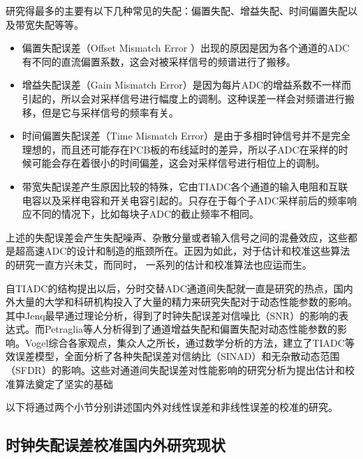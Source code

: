 	研究得最多的主要有以下几种常见的失配：偏置失配、增益失配、时间偏置失配以及带宽失配等等。
	\begin{itemize}
		\item 偏置失配误差（Offset Mismatch Error ）出现的原因是因为各个通道的ADC有不同的直流偏置系数，这会对被采样信号的频谱进行了搬移。
		\item 增益失配误差（Gain Mismatch Error）是因为每片ADC的增益系数不一样而引起的，所以会对采样信号进行幅度上的调制。这种误差一样会对频谱进行搬移，但是它与采样信号的频率有关。
		\item 时间偏置失配误差（Time Mismatch Error）是由于多相时钟信号并不是完全理想的，而且还可能存在PCB板的布线延时的差异，所以子ADC在采样的时候可能会存在着很小的时间偏差，这会对采样信号进行相位上的调制。		
		\item 带宽失配误差产生原因比较的特殊，它由TIADC各个通道的输入电阻和互联电容以及采样电容和开关电容引起的。只存在于每个子ADC采样前后的频率响应不同的情况下，比如每块子ADC的截止频率不相同。
		
	\end{itemize}
	
	上述的失配误差会产生失配噪声、杂散分量或者输入信号之间的混叠效应，这些都是超高速ADC的设计和制造的瓶颈所在。正因为如此，对于估计和校准这些算法的研究一直方兴未艾，而同时， 一系列的估计和校准算法也应运而生。
	\par
	自TIADC的结构提出以后，分时交替ADC通道间失配就一直是研究的热点，国内外大量的大学和科研机构投入了大量的精力来研究失配对于动态性能参数的影响。其中Jenq最早通过理论分析，得到了时钟失配误差对信噪比（SNR）的影响的表达式。而Petraglia等人分析得到了通道增益失配和偏置失配对动态性能参数的影响。Vogel\cite {vogel2005impact}综合各家观点，集众人之所长，通过数学分析的方法，建立了TIADC等效误差模型，全面分析了各种失配误差对信纳比（SINAD）和无杂散动态范围（SFDR）的影响。这些对通道间失配误差对性能影响的研究分析为提出估计和校准算法奠定了坚实的基础\par
	以下将通过两个小节分别讲述国内外对线性误差和非线性误差的校准的研究。
	
	
	\subsection {时钟失配误差校准国内外研究现状}
	
